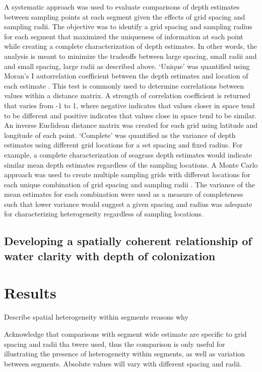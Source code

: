 \documentclass[letterpaper,12pt,oneside]{article}\usepackage[]{graphicx}\usepackage[]{color}
\begin{document}
A systematic approach was used to evaluate comparisons of depth estimates between sampling points at each segment given the effects of grid spacing and sampling radii.  The objective was to identify a grid spacing and sampling radius for each segment that maximized the uniqueness of information at each point while creating a complete characterization of depth estimates.  In other words, the analysis is meant to minimize the tradeoffs between large spacing, small radii and and small spacing, large radii as described above. `Unique' was quantified using Moran's I autorrelation coefficient between the depth estimates and location of each estimate \citep{Gittlemen90}.  This test is commonly used to determine correlations between values within a distance matrix.  A strength of correlation coefficient is returned that varies from -1 to 1, where negative indicates that values closer in space tend to be different and positive indicates that values close in space tend to be similar.  An inverse Euclidean distance matrix was created for each grid using latitude and longitude of each point.  `Complete' was quantified as the variance of depth estimates using different grid locations for a set spacing and fixed radius.  For example, a complete characterization of seagrass depth estimates would indicate similar mean depth estimates regardless of the sampling locations.  A Monte Carlo approach was used to create multiple sampling grids with different locations for each unique combination of grid spacing and sampling radii \citep{Hilborn97}.  The variance of the mean estimates for each combination were used as a measure of completeness such that lower variance would suggest a given spacing and radius was adequate for characterizing heterogeneity regardless of sampling locations.

\subsection{Developing a spatially coherent relationship of water clarity with depth of colonization}

\section{Results}

Describe spatial heterogeneity within segments reasons why

Acknowledge that comparisons with segment wide estimate are specific to grid spacing and radii tha twere used, thus the comparison is only useful for illustrating the presence of heterogeneity within segments, as well as variation between segments.  Absolute values will vary with different spacing and radii. 
\end{document}
